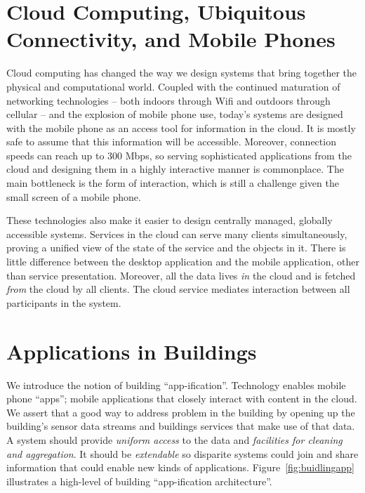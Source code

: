 

\section{Cloud Computing, Ubiquitous Connectivity, and Mobile Phones}
Cloud computing has changed the way we design systems that bring together the physical and computational world.  Coupled with the 
continued maturation of networking technologies -- both indoors through Wifi and outdoors through cellular -- and the explosion of mobile
phone use, today's systems are designed with the mobile phone as an access tool for information in the cloud.  It is mostly safe
to assume that this information will be accessible.  Moreover, connection speeds can reach up to 300 Mbps, so serving sophisticated
applications from the cloud and designing them in a highly interactive manner is commonplace.  The main bottleneck is the form of interaction, which
is still a challenge given the small screen of a mobile phone.

These technologies also make it easier to design centrally managed, globally accessible systems.  %
Services in the cloud
can serve many clients simultaneously, proving a unified view of the state of the service and the objects in it.  There is little difference 
between the desktop application and the mobile application, other than service presentation.  Moreover, all the data lives \emph{in} the cloud 
and is fetched \emph{from} the cloud by all clients.  The cloud service mediates interaction between all
participants in the system.

\section{Applications in Buildings}
We introduce the notion of building ``app-ification''.  Technology enables mobile phone ``apps''; mobile
applications that closely interact with content in the cloud.  We assert that a good way to address problem in the building
by opening up the building's sensor data streams and buildings services that make use of that data.  A system should provide 
\emph{uniform access} to the data and \emph{facilities for cleaning and aggregation}.  It should be \emph{extendable}
so disparite systems could join and share information that could enable new kinds of applications.  Figure~\ref{fig:buidlingapp}
illustrates a high-level of building ``app-ification architecture''.

